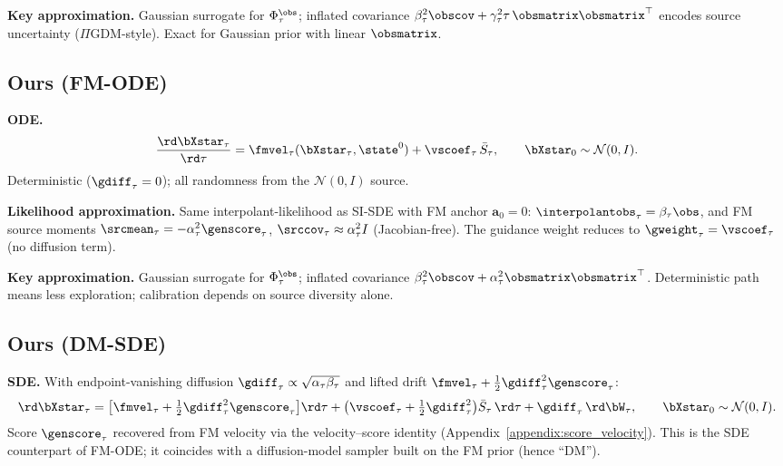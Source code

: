 \textbf{Key approximation.}
Gaussian surrogate for $\Phi_\tau^{\obs}$; inflated covariance $\beta_\tau^2\obscov+\gamma_\tau^2\tau\,\obsmatrix\obsmatrix^\top$ encodes source uncertainty ($\Pi$GDM-style). Exact for Gaussian prior with linear $\obsmatrix$.

\subsection{Ours (FM-ODE)}\label{appendix:method:fm_ode}

\textbf{ODE.}
\begin{align}
  \frac{\rd\bXstar_\tau}{\rd\tau}
  = \fmvel_\tau(\bXstar_\tau,\state^0)
  + \vscoef_\tau\,\bar{S}_\tau,
  \qquad \bXstar_0\sim\mathcal{N}(0,I).
\end{align}
Deterministic ($\gdiff_\tau=0$); all randomness from the $\mathcal{N}(0,I)$ source.

\textbf{Likelihood approximation.}
Same interpolant-likelihood as SI-SDE with FM anchor $\bm a_0=0$:
$\interpolantobs_\tau = \beta_\tau\obs$, and FM source moments $\srcmean_\tau=-\alpha_\tau^2\genscore_\tau$,
$\srccov_\tau\approx\alpha_\tau^2 I$ (Jacobian-free). The guidance weight reduces to $\gweight_\tau=\vscoef_\tau$ (no diffusion term).

\textbf{Key approximation.}
Gaussian surrogate for $\Phi_\tau^{\obs}$; inflated covariance $\beta_\tau^2\obscov+\alpha_\tau^2\obsmatrix\obsmatrix^\top$.
Deterministic path means less exploration; calibration depends on source diversity alone.

\subsection{Ours (DM-SDE)}\label{appendix:method:fm_sde}

\textbf{SDE.}
With endpoint-vanishing diffusion $\gdiff_\tau\propto\sqrt{\alpha_\tau\beta_\tau}$ and lifted drift $\fmvel_\tau+\tfrac12\gdiff_\tau^2\genscore_\tau$:
\begin{align}
  \rd\bXstar_\tau
  = \bigl[\fmvel_\tau + \tfrac12\gdiff_\tau^2\genscore_\tau\bigr]\rd\tau
  + \bigl(\vscoef_\tau + \tfrac12\gdiff_\tau^2\bigr)\bar{S}_\tau\,\rd\tau
  + \gdiff_\tau\,\rd\bW_\tau,
  \qquad \bXstar_0\sim\mathcal{N}(0,I).
\end{align}
Score $\genscore_\tau$ recovered from FM velocity via the velocity--score identity (Appendix~\ref{appendix:score_velocity}).
This is the SDE counterpart of FM-ODE; it coincides with a diffusion-model sampler built on the FM prior (hence ``DM'').

